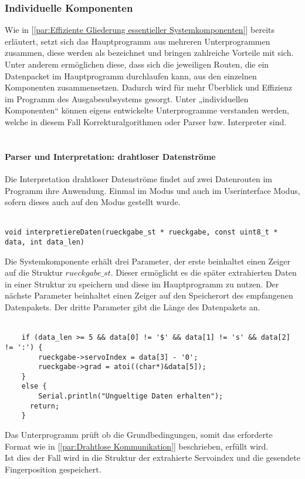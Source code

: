 \documentclass[titlepage,12pt,twoside]{article}
\begin{document}
\subsubsection{Individuelle Komponenten}
Wie in [\textcolor{blue}{\autoref{par:Effiziente Gliederung essentieller Systemkomponenten}}] bereits erläutert, setzt sich das Hauptprogramm aus mehreren 
Unterprogrammen zusammen, diese werden als  bezeichnet und bringen zahlreiche Vorteile mit sich. Unter anderem ermöglichen diese, dass 
sich die jeweiligen Routen, die ein Datenpacket im Hauptprogramm durchlaufen kann, aus den einzelnen Komponenten zusammensetzen. Dadurch wird für mehr 
Überblick und Effizienz im Programm des Ausgabesubsystems gesorgt. Unter „individuellen Komponenten“ können eigens entwickelte Unterprogramme verstanden 
werden, welche in diesem Fall Korrekturalgorithmen oder Parser bzw. Interpreter sind. \\
\\

\paragraph{Parser und Interpretation: drahtloser Datenströme}
\label{par:Parser und Interpretation: drahtloser Datenströme}
\hfill \break
\hfill \break
Die Interpretation drahtloser Datenströme findet auf zwei Datenrouten im Programm ihre Anwendung. Einmal im  Modus und auch im Userinterface 
Modus, sofern dieses auch auf den  Modus gestellt wurde. \\
\\
\footnotesize
\begin{lstlisting}
void interpretiereDaten(rueckgabe_st * rueckgabe, const uint8_t * data, int data_len)
\end{lstlisting}
\hfill \break
\normalsize
Die Systemkomponente erhält drei Parameter, der erste beinhaltet einen Zeiger auf die Struktur $rueckgabe\_st$. Dieser ermöglicht es die später extrahierten 
Daten in einer Struktur zu speichern und diese im Hauptprogramm zu nutzen. Der nächste Parameter beinhaltet einen Zeiger auf den Speicherort des 
empfangenen Datenpakets. Der dritte Parameter gibt die Länge des Datenpakets an. \\
\\
\footnotesize
\begin{lstlisting}
	if (data_len >= 5 && data[0] != '$' && data[1] != 's' && data[2] != ':') {
		rueckgabe->servoIndex = data[3] - '0';
		rueckgabe->grad = atoi((char*)&data[5]);
	}
	else {
		Serial.println("Ungueltige Daten erhalten");
	  return;
	}
\end{lstlisting}
\hfill \break
\normalsize
Das Unterprogramm prüft ob die Grundbedingungen, somit das erforderte Format wie in [\textcolor{blue}{\autoref{par:Drahtlose Kommunikation}}] beschrieben, erfüllt wird. \\
Ist dies der Fall wird in die Struktur  der extrahierte Servoindex und die gesendete Fingerposition gespeichert. \\
\\
\end{document}
